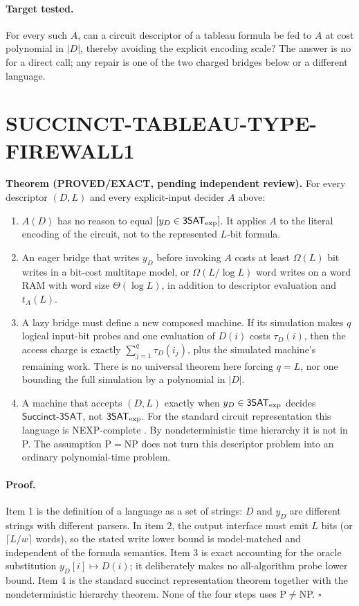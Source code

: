 \documentclass[11pt]{article}
\newcommand{\SAT}{\mathsf{3SAT}_{\rm exp}}
\newcommand{\SSAT}{\mathsf{Succinct\mbox{-}3SAT}}
\newcommand{\EXACT}{\textbf{PROVED/EXACT}}
\begin{document}
\paragraph{Target tested.}
For every such $A$, can a circuit descriptor of a tableau formula be fed to
$A$ at cost polynomial in $|D|$, thereby avoiding the explicit encoding scale?
The answer is no for a direct call; any repair is one of the two charged
bridges below or a different language.

\section*{SUCCINCT-TABLEAU-TYPE-FIREWALL1}
\textbf{Theorem (\EXACT{}, pending independent review).}
For every descriptor $(D,L)$ and every explicit-input decider $A$ above:
\begin{enumerate}
\item $A(D)$ has no reason to equal $[y_D\in\SAT]$.  It applies $A$ to the
literal encoding of the circuit, not to the represented $L$-bit formula.
\item An eager bridge that writes $y_D$ before invoking $A$ costs at least
$\Omega(L)$ bit writes in a bit-cost multitape model, or
$\Omega(L/\log L)$ word writes on a word RAM with word size
$\Theta(\log L)$, in addition to descriptor evaluation and $t_A(L)$.
\item A lazy bridge must define a new composed machine.  If its simulation
makes $q$ logical input-bit probes and one evaluation of $D(i)$ costs
$\tau_D(i)$, then the access charge is exactly
$\sum_{j=1}^{q}\tau_D(i_j)$, plus the simulated machine's remaining work.
There is no universal theorem here forcing $q=L$, nor one bounding the full
simulation by a polynomial in $|D|$.
\item A machine that accepts $(D,L)$ exactly when $y_D\in\SAT$ decides
$\SSAT$, not $\SAT$.  For the standard circuit representation this language
is NEXP-complete \cite{PY1986}.  By nondeterministic time hierarchy it is not
in P.  The assumption P$=$NP does not turn this descriptor problem into an
ordinary polynomial-time problem.
\end{enumerate}

\paragraph{Proof.}
Item 1 is the definition of a language as a set of strings: $D$ and $y_D$ are
different strings with different parsers.  In item 2, the output interface must
emit $L$ bits (or $\lceil L/w\rceil$ words), so the stated write lower bound is
model-matched and independent of the formula semantics.  Item 3 is exact
accounting for the oracle substitution $y_D[i]\mapsto D(i)$; it deliberately
makes no all-algorithm probe lower bound.  Item 4 is the standard succinct
representation theorem together with the nondeterministic hierarchy theorem.
None of the four steps uses P$\ne$NP. \hfill$\square$
\end{document}
